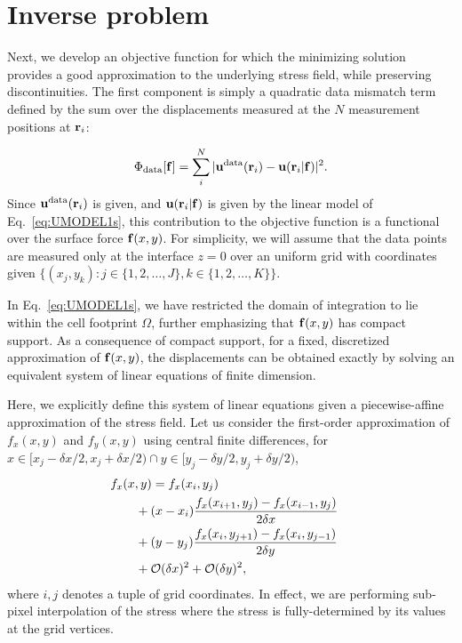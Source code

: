 \documentclass[aps,prl,reprint,twocolumn,groupedaddress,showpacs]{revtex4}
\def\f{{\bf f}}
\def\r{{\bf r}}
\def\u{{\bf u}}
\begin{document}
\section{Inverse problem}

Next, we develop an objective function for which the minimizing
solution provides a good approximation to the underlying stress field,
while preserving discontinuities.  The first component is simply a
quadratic data mismatch term defined by the sum over the displacements
measured at the $N$ measurement positions at $\r_{i}$:

\begin{equation}
\Phi_{\rm data}[\f] = \sum_{i}^{N}\vert \u^{\rm
  data}(\r_{i})- \u(\r_i\vert \f)\vert^{2}.
\label{PHIDATA}
\end{equation}
%
Since $\u^{\rm data}(\r_{i})$ is given, and $\u(\r_{i}\vert \f)$ is
given by the linear model of Eq.~\ref{eq:UMODEL1s}, this contribution
to the objective function is a functional over the surface force
$\f(x,y)$.  For simplicity, we will assume that the data points are
measured only at the interface $z=0$ over an uniform grid with
coordinates given $\{ (x_j,y_k) : j\in\{1,2,\ldots,J\},
k\in\{1,2,\ldots,K\}\}.$

In Eq.~\ref{eq:UMODEL1s}, we have restricted the domain of integration
to lie within the cell footprint $\Omega$, further emphasizing that
$\f(x,y)$ has compact support. As a consequence of compact
support, for a fixed, discretized approximation of
$\f(x,y)$, the displacements can be obtained exactly
by solving an equivalent system of linear equations of finite
dimension.

Here, we explicitly define this system of linear equations given a
piecewise-affine approximation of the stress field. Let us consider
the first-order approximation of $f_{x}(x,y)$ and $f_{y}(x,y)$ using
central finite differences, for $x\in[x_j - \delta x/2, x_j+\delta
  x/2) \cap y\in[y_j-\delta y/2, y_j + \delta y /2)$,
\begin{align}
\lefteqn{f_{x}(x,y) =f_{x}(x_i , y_j)  }\nonumber \\
& \qquad+ (x-x_i)\frac{f_{x}(x_{i+1},y_j) -f_{x}(x_{i-1},y_j) }{2\delta x}  \nonumber\\
&\qquad + (y-y_j)\frac{f_{x}(x_i,y_{j+1}) - f_{x}(x_i,y_{j-1}) }{2\delta y} \nonumber\\
&\qquad + \mathcal{O}(\delta x)^2 + \mathcal{O}(\delta y)^2,\label{eq:sigma_affine}
\end{align}
where $i,j$ denotes a tuple of grid coordinates. In effect, we are
performing sub-pixel interpolation of the stress where the stress is
fully-determined by its values at the grid vertices.
\end{document}
